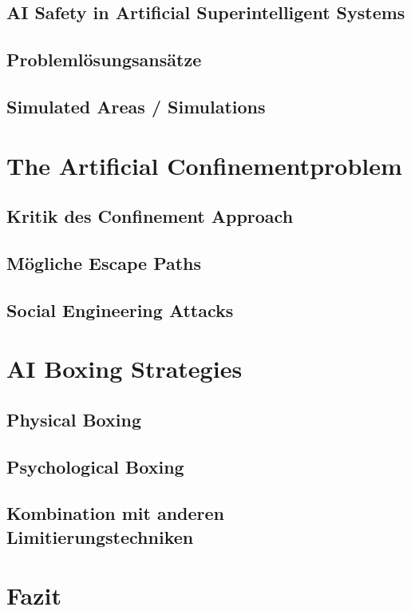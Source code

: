     \subsection{AI Safety in Artificial Superintelligent Systems}

    \subsection{Problemlösungsansätze} 
    \subsection{Simulated Areas / Simulations}
\section{The Artificial Confinementproblem}
    \subsection{Kritik des Confinement Approach}
    \subsection{Mögliche Escape Paths}
    \subsection{Social Engineering Attacks}
\section{AI Boxing Strategies}
    \subsection{Physical Boxing}
    \subsection{Psychological Boxing}
    \subsection{Kombination mit anderen Limitierungstechniken}
\section{Fazit}

\newpage



\listoffigures


